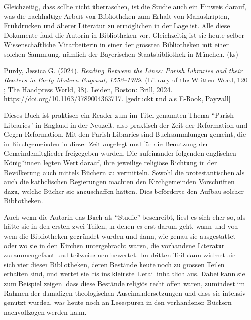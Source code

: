 \documentclass[a4paper,
fontsize=11pt,
oneside,
numbers=noperiodatend,
parskip=half-,
bibliography=totoc,
final
]{scrartcl}
\begin{document}
Gleichzeitig, dass sollte nicht überraschen, ist die Studie auch ein
Hinweis darauf, was die nachhaltige Arbeit von Bibliotheken zum Erhalt
von Manuskripten, Frühdrucken und älterer Literatur zu ermöglichen in
der Lage ist. Alle diese Dokumente fand die Autorin in Bibliotheken vor.
Gleichzeitig ist sie heute selber Wissenschaftliche Mitarbeiterin in
einer der grössten Bibliotheken mit einer solchen Sammlung, nämlich der
Bayerischen Staatsbibliothek in München. (ks)

Purdy, Jessica G. (2024). \emph{Reading Between the Lines: Parish
Libraries and their Readers in Early Modern England, 1558--1709.}
(Library of the Written Word, 120 ; The Handpress World, 98). Leiden,
Boston: Brill, 2024. \url{https://doi.org/10.1163/9789004363717}.
{[}gedruckt und als E-Book, Paywall{]}

Dieses Buch ist praktisch ein Reader zum im Titel genannten Thema
\enquote{Parish Libraries} in England in der Neuzeit, also praktisch der
Zeit der Reformation und Gegen-Reformation. Mit den Parish Libraries
sind Buchsammlungen gemeint, die in Kirchgemeinden in dieser Zeit
angelegt und für die Benutzung der Gemeindemitglieder freigegeben
wurden. Die aufeinander folgenden englischen König*innen legten Wert
darauf, ihre jeweilige religiöse Richtung in der Bevölkerung auch
mittels Büchern zu vermitteln. Sowohl die protestantischen als auch die
katholischen Regierungen machten den Kirchgemeinden Vorschriften dazu,
welche Bücher sie anzuschaffen hätten. Dies beförderte den Aufbau
solcher Bibliotheken.

Auch wenn die Autorin das Buch als \enquote{Studie} beschreibt, liest es
sich eher so, als hätte sie in den ersten zwei Teilen, in denen es erst
darum geht, wann und von wem die Bibliotheken gegründet wurden und dann,
wie genau sie ausgestattet oder wo sie in den Kirchen untergebracht
waren, die vorhandene Literatur zusammengefasst und teilweise neu
bewertet. Im dritten Teil dann widmet sie sich vier dieser Bibliotheken,
deren Bestände heute noch zu grossen Teilen erhalten sind, und wertet
sie bis ins kleinste Detail inhaltlich aus. Dabei kann sie zum Beispiel
zeigen, dass diese Bestände religiös recht offen waren, zumindest im
Rahmen der damaligen theologischen Auseinandersetzungen und dass sie
intensiv genutzt wurden, was heute noch an Lesespuren in den vorhandenen
Büchern nachvollzogen werden kann.
\end{document}
